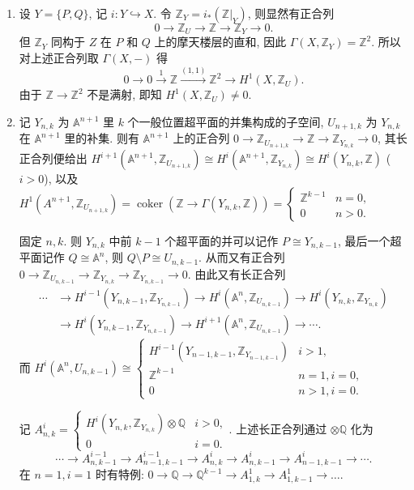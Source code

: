 \documentclass{article}
\theoremstyle{exercise}
\theoremstyle{plain}
\theoremstyle{remark}
\newenvironment{proofc}{\proof}{\endproof}
\def\A{\mathbb{A}}
\def\Z{\mathbb{Z}}
\def\Q{\mathbb{Q}}
\def\coker{\operatorname{coker}}
\begin{document}
\begin{proofc} \hfill
  \begin{enumerate}
    \item 设 $Y = \{ P, Q \}$, 记 $i \colon Y \hookrightarrow X$.
          令 $\Z_Y = i_*(\Z |_Y)$, 则显然有正合列
          \[
          0 \to \Z_U \to \Z \to \Z_Y \to 0.
          \]
          但 $\Z_Y$ 同构于 $Z$ 在 $P$ 和 $Q$ 上的摩天楼层的直和,
          因此 $\Gamma(X, \Z_Y) = \Z^2$. 所以对上述正合列取 $\Gamma(X, -)$ 得
          \[
          0 \to 0 \xrightarrow{1} \Z \xrightarrow{(1, 1)} \Z^2 \to H^1(X, \Z_U).
          \]
          由于  $\Z \to \Z^2$ 不是满射, 即知 $H^1(X, \Z_U) \neq 0$.
    \item 记 $Y_{n, k}$ 为 $\A^{n+1}$ 里 $k$ 个一般位置超平面的并集构成的子空间,
          $U_{n+1, k}$ 为 $Y_{n, k}$ 在 $\A^{n+1}$ 里的补集.
          则有 $\A^{n+1}$ 上的正合列 $0 \to \Z_{U_{n+1, k}} \to \Z \to \Z_{Y_{n, k}} \to 0$,
          其长正合列便给出 $H^{i+1}(\A^{n+1}, \Z_{U_{n+1, k}}) \cong H^i(\A^{n+1}, \Z_{Y_{n, k}}) \cong H^i(Y_{n, k}, \Z)$ ($i > 0$),
          以及 $H^1(A^{n+1}, \Z_{U_{n+1, k}}) = \coker(\Z \to \Gamma(Y_{n, k}, \Z)) = \begin{cases} \Z^{k-1} & n = 0, \\ 0 & n > 0. \end{cases}$

          固定 $n, k$. 则 $Y_{n, k}$ 中前 $k-1$ 个超平面的并可以记作 $P \cong Y_{n, k-1}$,
          最后一个超平面记作 $Q \cong \A^n$, 则 $Q \setminus P \cong U_{n, k-1}$. 从而又有正合列
          $0 \to \Z_{U_{n, k-1}} \to \Z_{Y_{n, k}} \to \Z_{Y_{n, k-1}} \to 0$.
          由此又有长正合列
          \begin{align*}
          \cdots &\to H^{i-1}(Y_{n, k-1}, \Z_{Y_{n, k-1}})
          \to H^i(\A^n, \Z_{U_{n, k-1}})
          \to H^i(Y_{n, k}, \Z_{Y_{n, k}}) \\
          &\to H^i(Y_{n, k-1}, \Z_{Y_{n, k-1}})
          \to H^{i+1}(\A^n, \Z_{U_{n, k-1}})
          \to \cdots.
          \end{align*}
          而 $H^i(\A^n, U_{n, k-1}) \cong \begin{cases} H^{i-1}(Y_{n-1, k-1}, \Z_{Y_{n-1, k-1}}) & i > 1, \\ \Z^{k-1} & n=1, i=0, \\ 0 & n>1, i=0. \end{cases}$

          记 $A_{n, k}^i = \begin{cases} H^i(Y_{n, k}, \Z_{Y_{n, k}}) \otimes \Q & i > 0, \\ 0 & i = 0. \end{cases}$. 上述长正合列通过 $\otimes \Q$ 化为
          \[
          \cdots \to A_{n, k-1}^{i-1} \to A_{n-1, k-1}^{i-1} \to A_{n, k}^i \to A_{n, k-1}^i \to A_{n-1, k-1}^i \to \cdots.
          \]
          在 $n = 1, i = 1$ 时有特例: $0 \to \Q \to \Q^{k-1} \to A_{1, k}^1 \to A_{1, k-1}^1 \to \dots$.


\end{enumerate}
\end{proofc}
\end{document}
